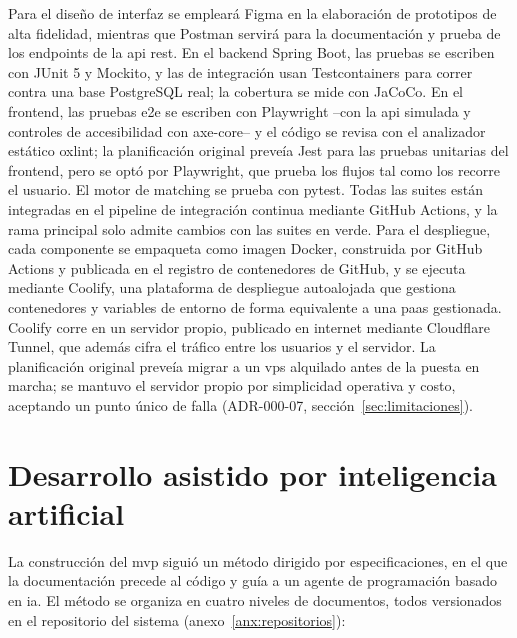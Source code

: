 Para el diseño de interfaz se empleará Figma en la elaboración de
prototipos de alta fidelidad, mientras que Postman servirá para la
documentación y prueba de los endpoints de la \gls{api} \gls{rest}. En
el backend Spring Boot, las pruebas se escriben con JUnit 5 y Mockito, y
las de integración usan Testcontainers para correr contra una base
PostgreSQL real; la cobertura se mide con JaCoCo. En el frontend, las
pruebas \gls{e2e} se escriben con Playwright --con la \gls{api}
simulada y controles de accesibilidad con axe-core-- y el código se
revisa con el analizador estático oxlint; la planificación original
preveía Jest para las pruebas unitarias del frontend, pero se optó por
Playwright, que prueba los flujos tal como los recorre el usuario. El
motor de \gls{matching} se prueba con pytest. Todas las suites están
integradas en el pipeline de integración continua mediante GitHub
Actions, y la rama principal solo admite cambios con las suites en
verde. Para el despliegue, cada componente se empaqueta como imagen
Docker, construida por GitHub Actions y publicada en el registro de
contenedores de GitHub, y se ejecuta mediante Coolify, una plataforma de
despliegue autoalojada que gestiona contenedores y variables de entorno
de forma equivalente a una \gls{paas} gestionada. Coolify corre en un
servidor propio, publicado en internet mediante Cloudflare Tunnel, que
además cifra el tráfico entre los usuarios y el servidor. La planificación original
preveía migrar a un \gls{vps} alquilado antes de la puesta en marcha; se
mantuvo el servidor propio por simplicidad operativa y costo, aceptando
un punto único de falla (ADR-000-07,
sección~\ref{sec:limitaciones}).

\section{Desarrollo asistido por inteligencia artificial}\label{sec:desarrollo-ia}

La construcción del \gls{mvp} siguió un método dirigido por
especificaciones, en el que la documentación precede al código y guía a
un agente de programación basado en \gls{ia}. El método se organiza en
cuatro niveles de documentos, todos versionados en el repositorio del
sistema (anexo~\ref{anx:repositorios}):

